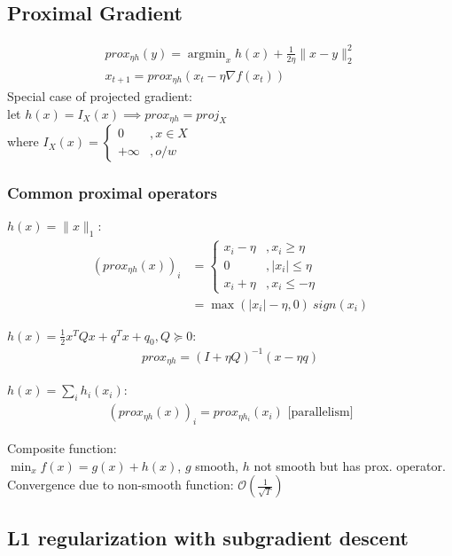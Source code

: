 \documentclass[8pt,letter]{article}
\DeclareMathOperator*{\argmin}{argmin}
\begin{document}
\begin{multicols*}{2}
  \subsection {Proximal Gradient}
  \begin{align*}
    prox_{\eta h}(y) = \argmin_x h(x) + \frac{1}{2 \eta} \|x-y\|_2^2\\
    x_{t+1} = prox_{\eta h}(x_t - \eta \nabla f(x_t))
  \end{align*}
  Special case of projected gradient:\\
  let $h(x)=I_X(x) \implies prox_{\eta h} = proj_X$\\
  where $I_X(x) =
  \begin{cases}
    0 &, x \in X\\
    +\infty &, o/w
  \end{cases}$

  \subsubsection{Common proximal operators}
  $h(x) = \|x\|_1$:\\
  \begin{align*}
    (prox_{\eta h}(x))_i & = \begin{cases}
      x_i - \eta &, x_i \geq \eta\\
      0 &, |x_i| \leq \eta\\
      x_i + \eta &, x_i \leq -\eta
    \end{cases}\\
    & = \max(|x_i|-\eta,0)\ sign(x_i)
  \end{align*}
  
  $h(x)=\frac{1}{2} x^T Q x + q^T x + q_0, Q \succeq 0$:
  \begin{align*}
    prox_{\eta h} = (I + \eta Q)^{-1} (x- \eta q)
  \end{align*}

  $h(x)=\sum_i h_i(x_i)$:
  \begin{align*}
    (prox_{\eta h}(x))_i = prox_{\eta h_i}(x_i) \text{ [parallelism]}
  \end{align*}

  Composite function:\\
  $\min_x f(x) = g(x) + h(x)$, $g$ smooth, $h$ not smooth but has prox. operator.\\
  Convergence due to non-smooth function: $\mathcal{O}(\frac{1}{\sqrt{T}})$\\

  \subsection{L1 regularization with subgradient descent}
  

\end{multicols*}
\end{document}
